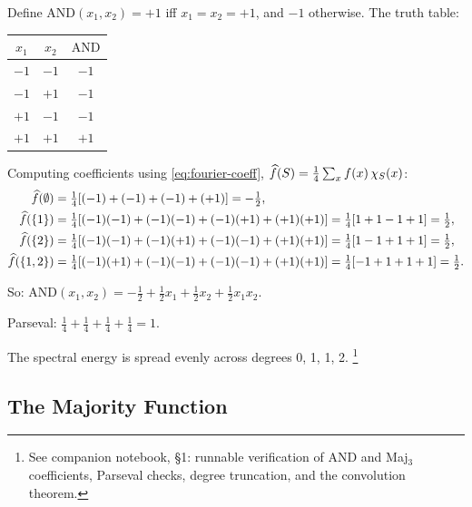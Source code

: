 \begin{example}\label{ex:and}
Define $\text{AND}(x_1, x_2) = +1$ iff $x_1 = x_2 = +1$, and $-1$
otherwise. The truth table:
\begin{center}
\begin{tabular}{ccc}
\toprule
$x_1$ & $x_2$ & $\text{AND}$ \\
\midrule
$-1$ & $-1$ & $-1$ \\
$-1$ & $+1$ & $-1$ \\
$+1$ & $-1$ & $-1$ \\
$+1$ & $+1$ & $+1$ \\
\bottomrule
\end{tabular}
\end{center}

Computing coefficients using \eqref{eq:fourier-coeff}, $\widehat{f}(S) = \frac{1}{4}\sum_x f(x)\,\chi_S(x)$:
\begin{align*}
  \widehat{f}(\emptyset) &= \tfrac{1}{4}[(-1)+(-1)+(-1)+(+1)] = -\tfrac{1}{2}, \\
  \widehat{f}(\{1\}) &= \tfrac{1}{4}[(-1)(-1) + (-1)(-1) + (-1)(+1) + (+1)(+1)]
  = \tfrac{1}{4}[1 + 1 - 1 + 1] = \tfrac{1}{2}, \\
  \widehat{f}(\{2\}) &= \tfrac{1}{4}[(-1)(-1) + (-1)(+1) + (-1)(-1) + (+1)(+1)]
  = \tfrac{1}{4}[1 - 1 + 1 + 1] = \tfrac{1}{2}, \\
  \widehat{f}(\{1,2\}) &= \tfrac{1}{4}[(-1)(+1) + (-1)(-1) + (-1)(-1) + (+1)(+1)]
  = \tfrac{1}{4}[-1+1+1+1] = \tfrac{1}{2}.
\end{align*}

So: $\text{AND}(x_1, x_2) = -\frac{1}{2} + \frac{1}{2}x_1 + \frac{1}{2}x_2 + \frac{1}{2}x_1 x_2$.

Parseval: $\frac{1}{4} + \frac{1}{4} + \frac{1}{4} + \frac{1}{4} = 1$. \checkmark

The spectral energy is spread evenly across degrees 0, 1, 1, 2.%
\footnote{See companion notebook, \S1: runnable verification of AND and
Maj$_3$ coefficients, Parseval checks, degree truncation, and the
convolution theorem.}
\end{example}


\subsection{The Majority Function}\label{sec:majority}

